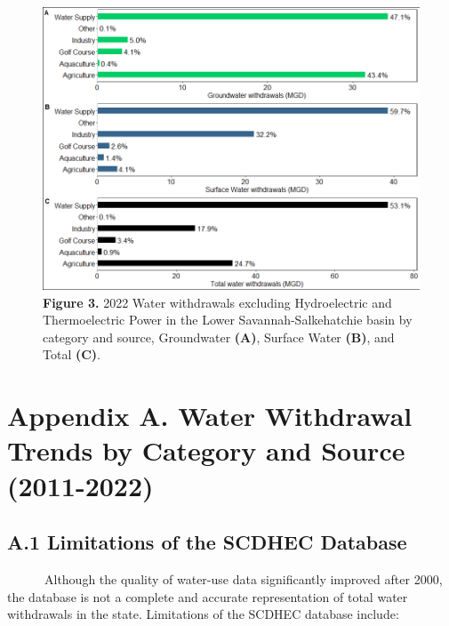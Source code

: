 \documentclass[
]{article}
\begin{document}
\begin{figure}[H]

{\centering \includegraphics{LSS_figures/combine-bar-plots-nopower-1} 

}

\caption{\textbf{Figure 3.} 2022 Water withdrawals excluding Hydroelectric and Thermoelectric Power in the Lower Savannah-Salkehatchie basin by category and source, Groundwater \textbf{(A)}, Surface Water \textbf{(B)}, and Total \textbf{(C)}.}\label{fig:combine-bar-plots-nopower}
\end{figure}

\newpage

\hypertarget{appendix-a.-water-withdrawal-trends-by-category-and-source-2011-2022}{%
\section{Appendix A. Water Withdrawal Trends by Category and Source
(2011-2022)}\label{appendix-a.-water-withdrawal-trends-by-category-and-source-2011-2022}}

\hypertarget{a.1-limitations-of-the-scdhec-database}{%
\subsection{A.1 Limitations of the SCDHEC
Database}\label{a.1-limitations-of-the-scdhec-database}}

~~~~~~Although the quality of water-use data significantly improved
after 2000, the database is not a complete and accurate representation
of total water withdrawals in the state. Limitations of the SCDHEC
database include:
\end{document}
